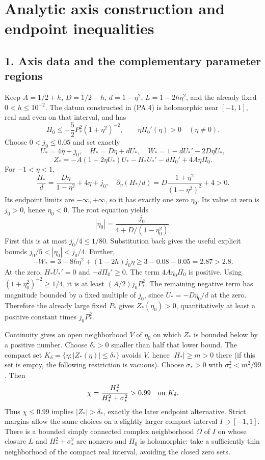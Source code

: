 \documentclass[10pt,a4paper]{article}
\begin{document}
\section{Analytic axis construction and endpoint inequalities}\label{pa:sec:component-axis}

\subsection{1. Axis data and the complementary parameter regions}

Keep \(A=1/2+h\), \(D=1/2-h\), \(d=1-\eta^2\), \(L=1-2h\eta^2\), and the already fixed \(0<h\le10^{-2}\). The datum constructed in (PA.4) is holomorphic near \([-1,1]\), real and even on that interval, and has
\[
\Pi_0\le-\frac52P_*^2(1+\eta^2)^{-2},\qquad
\eta\Pi_0'(\eta)>0\quad(\eta\ne0).
\]
Choose \(0<j_0\le0.05\) and set exactly
\[
U_*=4\eta+j_0,\quad H_*=D\eta+dU_*,
\quad W_*=1-dU_*'-2D\eta U_*,
\]
\[
Z_*=-A(1-2\eta U_*)U_*-H_*U_*'-d\Pi_0'+4A\eta\Pi_0.
\]
For \(-1<\eta<1\),
\[
\frac{H_*}{d}=\frac{D\eta}{1-\eta^2}+4\eta+j_0,
\quad \partial_\eta(H_*/d)
=D\frac{1+\eta^2}{(1-\eta^2)^2}+4>0.
\]
Its endpoint limits are \(-\infty,+\infty\), so it has exactly one zero \(\eta_0\). Its value at zero is \(j_0>0\), hence \(\eta_0<0\). The root equation yields
\[
|\eta_0|=\frac{j_0}{4+D/(1-\eta_0^2)}.
\]
First this is at most \(j_0/4\le1/80\). Substitution back gives the useful explicit bounds \(j_0/5<|\eta_0|<j_0/4\). Further,
\[
-W_*=3-8h\eta^2+(1-2h)j_0\eta
\ge3-0.08-0.05=2.87>2.8.
\]
At the zero, \(H_*U_*'=0\) and \(-d\Pi_0'\ge0\). The term \(4A\eta_0\Pi_0\) is positive. Using \((1+\eta_0^2)^{-2}\ge1/4\), it is at least \((A/2)j_0P_*^2\). The remaining negative term has magnitude bounded by a fixed multiple of \(j_0\), since \(U_*=-D\eta_0/d\) at the zero. Therefore the already large fixed \(P_*\) gives \(Z_*(\eta_0)>0\), quantitatively at least a positive constant times \(j_0P_*^2\).

Continuity gives an open neighborhood \(V\) of \(\eta_0\) on which \(Z_*\) is bounded below by a positive number. Choose \(\delta_*>0\) smaller than half that lower bound. The compact set \(K_\delta=\{\eta:|Z_*(\eta)|\le\delta_*\}\) avoids \(V\), hence \(|H_*|\ge m>0\) there (if this set is empty, the following restriction is vacuous). Choose \(\sigma_*>0\) with \(\sigma_*^2<m^2/99\). Then
\[
\chi=\frac{H_*^2}{H_*^2+\sigma_*^2}>0.99\quad\hbox{on }K_\delta.
\]
Thus \(\chi\le0.99\) implies \(|Z_*|>\delta_*\), exactly the later endpoint alternative. Strict margins allow the same choices on a slightly larger compact interval \(I\supset[-1,1]\). There is a bounded simply connected complex neighborhood \(\Omega\) of \(I\) on whose closure \(L\) and \(H_*^2+\sigma_*^2\) are nonzero and \(\Pi_0\) is holomorphic: take a sufficiently thin neighborhood of the compact real interval, avoiding the closed zero sets.
\end{document}
